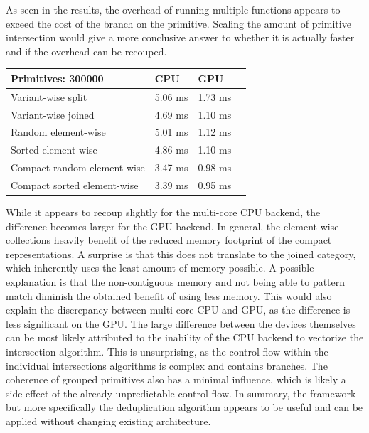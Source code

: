 \documentclass{article}
\begin{document}
As seen in the results, the overhead of running multiple functions appears to exceed the cost of the branch on the primitive.
Scaling the amount of primitive intersection would give a more conclusive answer to whether it is actually faster and if the overhead can be recouped.  

\begin{center}
    \begin{tabular}{ | m{14em} | m{8em}| m{8em} | m{8em} | } 
      \hline
      {\bf Primitives: 300000} & {\bf CPU} & {\bf GPU} \\ 
      \hline
      Variant-wise split          & 5.06 ms & 1.73 ms\\ 
      \hline
      Variant-wise joined         & 4.69 ms & 1.10 ms\\ 
      \hline
      Random element-wise         & 5.01 ms & 1.12 ms\\ 
      \hline
      Sorted element-wise         & 4.86 ms & 1.10 ms\\ 
      \hline
      Compact random element-wise & 3.47 ms & 0.98 ms\\ 
      \hline
      Compact sorted element-wise & 3.39 ms & 0.95 ms\\ 
      \hline
    \end{tabular}
\end{center}

While it appears to recoup slightly for the multi-core CPU backend, the difference becomes larger for the GPU backend.
In general, the element-wise collections heavily benefit of the reduced memory footprint of the compact representations.
A surprise is that this does not translate to the joined category, which inherently uses the least amount of memory possible.
A possible explanation is that the non-contiguous memory and not being able to pattern match diminish the obtained benefit of using less memory.
This would also explain the discrepancy between multi-core CPU and GPU, as the difference is less significant on the GPU.
The large difference between the devices themselves can be most likely attributed to the inability of the CPU backend to vectorize the intersection algorithm.
This is unsurprising, as the control-flow within the individual intersections algorithms is complex and contains branches.  
The coherence of grouped primitives also has a minimal influence, which is likely a side-effect of the already unpredictable control-flow.
In summary, the framework but more specifically the deduplication algorithm appears to be useful and can be applied without changing existing architecture.
\end{document}
